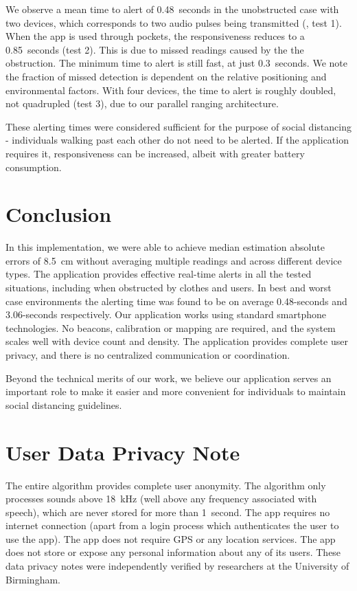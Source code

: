 \documentclass{article}
\begin{document}
We observe a mean time to alert of 0.48~seconds in the unobstructed case with two devices, which corresponds to two audio pulses being transmitted (, test 1). When the app is used through pockets, the responsiveness reduces to a 0.85~seconds (test 2). This is due to missed readings caused by the the obstruction. The minimum time to alert is still fast, at just 0.3~seconds. We note the fraction of missed detection is dependent on the relative positioning and environmental factors. With four devices, the time to alert is roughly doubled, not quadrupled (test 3), due to our parallel ranging architecture.

These alerting times were considered sufficient for the purpose of social distancing - individuals walking past each other do not need to be alerted. If the application requires it, responsiveness can be increased, albeit with greater battery consumption. 


\section{Conclusion}
\label{sec:conclusion}


In this implementation, we were able to achieve median estimation absolute errors of 8.5~cm without averaging multiple readings and across different device types. The application provides effective real-time alerts in all the tested situations, including when obstructed by clothes and users. In best and worst case environments the alerting time was found to be on average 0.48-seconds and 3.06-seconds respectively. Our application works using standard smartphone technologies. No beacons, calibration or mapping are required, and the system scales well with device count and density. The application provides complete user privacy, and there is no centralized communication or coordination. 

Beyond the technical merits of our work, we believe our application serves an important role to make it easier and more convenient for individuals to maintain social distancing guidelines. 

\section*{User Data Privacy Note}
The entire algorithm provides complete user anonymity. The algorithm only processes sounds above 18~kHz (well above any frequency associated with speech), which are never stored for more than 1~second. The app requires no internet connection (apart from a login process which authenticates the user to use the app). The app does not require GPS or any location services. The app does not store or expose any personal information about any of its users. These data privacy notes were independently verified by researchers at the University of Birmingham.
\end{document}
